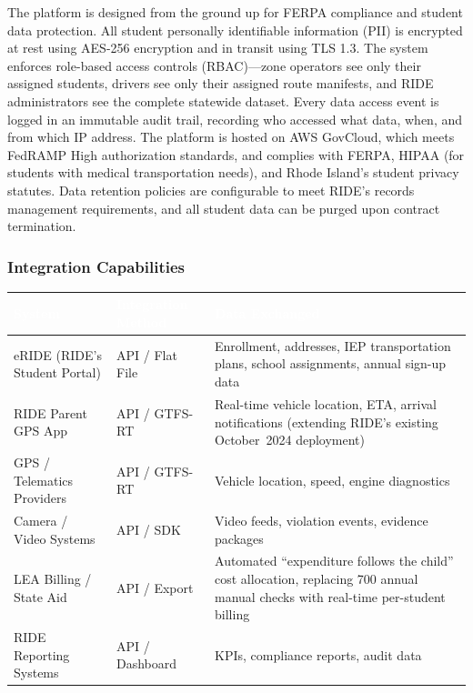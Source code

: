 \begin{description}[style=nextline, leftmargin=0.5cm]
    \item[\faIcon{user-shield} \textbf{FERPA Compliance:}] The platform is designed from the ground up for FERPA compliance and student data protection. All student personally identifiable information (PII) is encrypted at rest using AES-256 encryption and in transit using TLS 1.3. The system enforces role-based access controls (RBAC)---zone operators see only their assigned students, drivers see only their assigned route manifests, and RIDE administrators see the complete statewide dataset. Every data access event is logged in an immutable audit trail, recording who accessed what data, when, and from which IP address. The platform is hosted on AWS GovCloud, which meets FedRAMP High authorization standards, and complies with FERPA, HIPAA (for students with medical transportation needs), and Rhode Island's student privacy statutes. Data retention policies are configurable to meet RIDE's records management requirements, and all student data can be purged upon contract termination.
\end{description}

\subsubsection{Integration Capabilities}

\begin{tabularx}{\textwidth}{|X|X|X|}
\hline
\rowcolor{tableHeader}
\textcolor{white}{\textbf{System}} &
\textcolor{white}{\textbf{Integration Method}} &
\textcolor{white}{\textbf{Data Exchanged}} \\
\hline
eRIDE (RIDE's Student Portal) & API / Flat File & Enrollment, addresses, IEP transportation plans, school assignments, annual sign-up data \\ \hline
RIDE Parent GPS App & API / GTFS-RT & Real-time vehicle location, ETA, arrival notifications (extending RIDE's existing October~2024 deployment) \\ \hline
GPS / Telematics Providers & API / GTFS-RT & Vehicle location, speed, engine diagnostics \\ \hline
Camera / Video Systems & API / SDK & Video feeds, violation events, evidence packages \\ \hline
LEA Billing / State Aid & API / Export & Automated ``expenditure follows the child'' cost allocation, replacing 700 annual manual checks with real-time per-student billing \\ \hline
RIDE Reporting Systems & API / Dashboard & KPIs, compliance reports, audit data \\ \hline
\end{tabularx}
